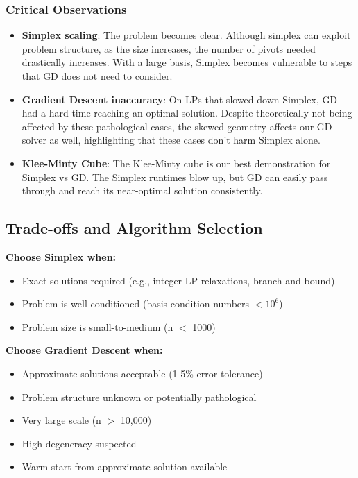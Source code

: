 \documentclass[11pt]{article}
\begin{document}
\subsubsection{Critical Observations}
\begin{itemize}
    \item \textbf{Simplex scaling}: The problem becomes clear. Although simplex can exploit problem structure, as the size increases, the number of pivots needed drastically increases. With a large basis, Simplex becomes vulnerable to steps that GD does not need to consider.
    \item \textbf{Gradient Descent inaccuracy}: On LPs that slowed down Simplex, GD had a hard time reaching an optimal solution. Despite theoretically not being affected by these pathological cases, the skewed geometry affects our GD solver as well, highlighting that these cases don't harm Simplex alone.
    \item \textbf{Klee-Minty Cube}: The Klee-Minty cube is our best demonstration for Simplex vs GD. The Simplex runtimes blow up, but GD can easily pass through and reach its near-optimal solution consistently.
    
\end{itemize}

\subsection{Trade-offs and Algorithm Selection}

\textbf{Choose Simplex when:}
\begin{itemize}
    \item Exact solutions required (e.g., integer LP relaxations, branch-and-bound)
    \item Problem is well-conditioned (basis condition numbers  \(<10^6\))
    \item Problem size is small-to-medium (n \(<\) 1000)
\end{itemize}

\textbf{Choose Gradient Descent when:}
\begin{itemize}
    \item Approximate solutions acceptable (1-5\% error tolerance)
    \item Problem structure unknown or potentially pathological
    \item Very large scale (n \(>\) 10,000)
    \item High degeneracy suspected
    \item Warm-start from approximate solution available
\end{itemize}
\end{document}
